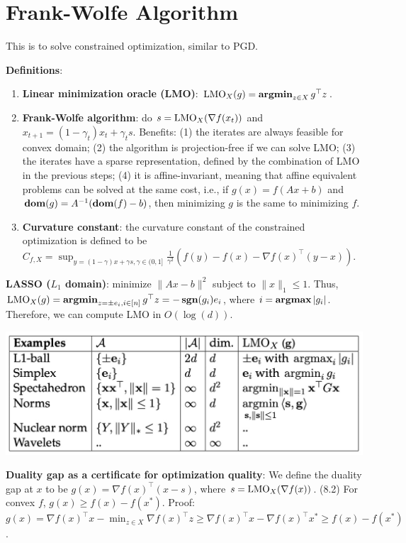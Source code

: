 \section{Frank-Wolfe Algorithm}

This is to solve constrained optimization, similar to PGD.

\textbf{Definitions}:
\begin{enumerate}
    \item \textbf{Linear minimization oracle (LMO)}: $\operatorname{LMO}_X(g) = \operatorname{\textbf{argmin}}_{z\in X} g^\top z$.
    \item \textbf{Frank-Wolfe algorithm}: do $s = \operatorname{LMO}_X(\nabla f(x_t))$ and $x_{t+1} = (1-\gamma_t)x_t+\gamma_t s$. Benefits: (1) the iterates are always feasible for convex domain; (2) the algorithm is projection-free if we can solve LMO; (3) the iterates have a sparse representation, defined by the combination of LMO in the previous steps; (4) it is affine-invariant, meaning that affine equivalent problems can be solved at the same cost, i.e., if $g(x)=f(Ax+b)$ and $\operatorname{\textbf{dom}}(g)=A^{-1}(\operatorname{\textbf{dom}}(f)-b)$, then minimizing $g$ is the same to minimizing $f$.
    \item \textbf{Curvature constant}: the curvature constant of the constrained optimization is defined to be $C_{f,X} = \sup_{y=(1-\gamma)x+\gamma s, \gamma \in (0,1]} \frac{1}{\gamma^2} (f(y) - f(x) - \nabla f(x)^\top (y-x))$. 
\end{enumerate}

\textbf{LASSO ($L_1$ domain)}: minimize $\|Ax-b\|^2$ subject to $\|x\|_1\le 1$. Thus, $\operatorname{LMO}_X(g) = \operatorname{\textbf{argmin}}_{z = \pm e_i, i\in [n]} g^\top z = -\operatorname{\textbf{sgn}}(g_i) e_i$, where $i = \operatorname{\textbf{argmax}} |g_i|$. Therefore, we can compute LMO in $O(\log(d))$.

\includegraphics[width=\linewidth]{imgs/LMO.jpg}

\textbf{Duality gap as a certificate for optimization quality}: We define the duality gap at $x$ to be $g(x) = \nabla f(x)^\top (x-s)$, where $s = \operatorname{LMO}_X(\nabla f(x))$. (8.2) For convex $f$, $g(x) \ge f(x) - f(x^*)$. Proof: $g(x) = \nabla f(x)^\top x - \min_{z \in X} \nabla f(x)^\top z \ge \nabla f(x)^\top x - \nabla f(x)^\top x^* \ge f(x) - f(x^*)$.

